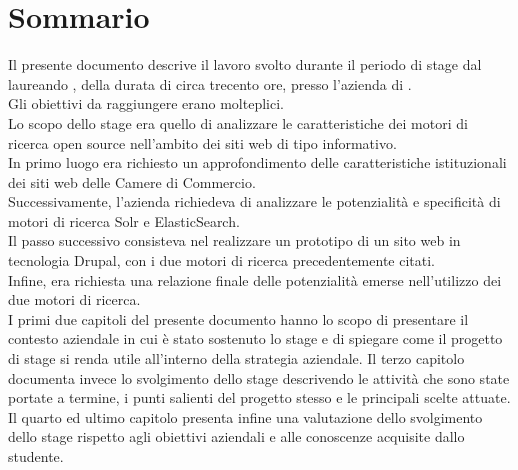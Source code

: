 
\cleardoublepage
{}
{}
\begingroup
\let\clearpage\relax
\let\cleardoublepage\relax
\let\cleardoublepage\relax

\chapter*{Sommario}

Il presente documento descrive il lavoro svolto durante il periodo di stage dal laureando \autore, della durata di circa trecento ore, presso l'azienda \nomeAzienda di \locazioneAzienda. \\
Gli obiettivi da raggiungere erano molteplici. \\
Lo scopo dello stage era quello di analizzare le caratteristiche dei motori di ricerca \gls{open source} nell'ambito dei siti web di tipo informativo.\\
In primo luogo era richiesto un approfondimento delle caratteristiche istituzionali dei siti web delle Camere di Commercio. \\
Successivamente, l'azienda richiedeva di analizzare le potenzialità e specificità di motori di ricerca \gls{Solr} e \gls{ElasticSearch}. \\
Il passo successivo consisteva nel realizzare un prototipo di un sito web in tecnologia \gls{Drupal}, con i due motori di ricerca precedentemente citati. \\
Infine, era richiesta una relazione finale delle potenzialità emerse nell'utilizzo dei due motori di ricerca. \\
I primi due capitoli del presente documento hanno lo scopo di presentare il contesto aziendale in cui è stato sostenuto lo stage e di spiegare come il progetto di stage si renda utile all’interno della strategia aziendale. Il terzo capitolo documenta invece lo svolgimento dello stage descrivendo le attività che sono state portate a termine, i punti salienti del progetto stesso e le principali scelte attuate. Il quarto ed ultimo capitolo presenta infine una valutazione dello svolgimento dello stage rispetto agli obiettivi aziendali e alle conoscenze acquisite dallo studente.


\endgroup

\vfill